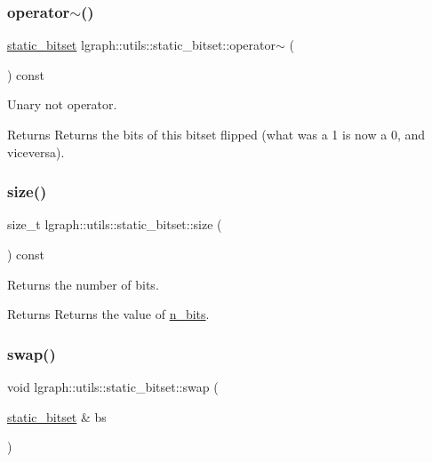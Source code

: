 \subsubsection{\texorpdfstring{operator$\sim$()}{operator~()}}
{\footnotesize\ttfamily \hyperlink{classlgraph_1_1utils_1_1static__bitset}{static\+\_\+bitset} lgraph\+::utils\+::static\+\_\+bitset\+::operator$\sim$ (\begin{DoxyParamCaption}{ }\end{DoxyParamCaption}) const}



Unary not operator. 

\begin{DoxyReturn}{Returns}
Returns the bits of this bitset flipped (what was a 1 is now a 0, and viceversa). 
\end{DoxyReturn}
\mbox{\label{classlgraph_1_1utils_1_1static__bitset_a89b2297eb5ffa6e632a49627d99b994e}} 
\subsubsection{\texorpdfstring{size()}{size()}}
{\footnotesize\ttfamily size\+\_\+t lgraph\+::utils\+::static\+\_\+bitset\+::size (\begin{DoxyParamCaption}{ }\end{DoxyParamCaption}) const}



Returns the number of bits. 

\begin{DoxyReturn}{Returns}
Returns the value of \hyperlink{classlgraph_1_1utils_1_1static__bitset_aebc02986838d70f13d3c10f390d11211}{n\+\_\+bits}. 
\end{DoxyReturn}
\mbox{\label{classlgraph_1_1utils_1_1static__bitset_ae1737eb8f5aed69b6dd69c75334ef23a}} 
\subsubsection{\texorpdfstring{swap()}{swap()}}
{\footnotesize\ttfamily void lgraph\+::utils\+::static\+\_\+bitset\+::swap (\begin{DoxyParamCaption}\item[{\hyperlink{classlgraph_1_1utils_1_1static__bitset}{static\+\_\+bitset} \&}]{bs }\end{DoxyParamCaption})}



